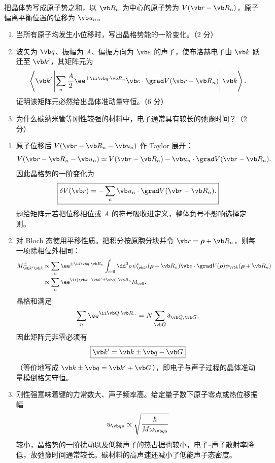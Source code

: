 \begin{question}[10 分]
把晶体势写成原子势之和，以 $\vb R_n$ 为中心的原子势为 $V(\vb r-\vb R_n)$，原子偏离平衡位置的位移为 $\vb u_n$。
\begin{enumerate}
  \item 当所有原子均发生小位移时，写出晶格势能的一阶变化。（2 分）
  \item 波矢为 $\vb q$、振幅为 $A$、偏振方向为 $\vb e$ 的声子，使布洛赫电子由 $\vb k$ 跃迁至 $\vb k'$，其矩阵元为
  \[
  \left\langle\vb k'\left|
  \sum_n\frac A2\ee^{\pm\ii\vb q\cdot\vb R_n}
  \vb e\cdot\grad V(\vb r-\vb R_n)
  \right|\vb k\right\rangle.
  \]
  证明该矩阵元必然给出晶体准动量守恒。（6 分）
  \item 为什么碳纳米管等刚性较强的材料中，电子通常具有较长的弛豫时间？（2 分）
\end{enumerate}


\begin{solution}
\begin{enumerate}
  \item 原子位移后
  $V(\vb r-\vb R_n-\vb u_n)$ 作 Taylor 展开：
  \[
    V(\vb r-\vb R_n-\vb u_n)
    \simeq V(\vb r-\vb R_n)
    -\vb u_n\cdot\grad V(\vb r-\vb R_n).
  \]
  因此晶格势的一阶变化为
  \[
    \boxed{\delta V(\vb r)=-\sum_n\vb u_n\cdot
    \grad V(\vb r-\vb R_n).}
  \]
  题给矩阵元若把位移相位或 $A$ 的符号吸收进定义，整体负号不影响选择定则。
  \item 对 Bloch 态使用平移性质。把积分按原胞分块并令
  $\vb r=\boldsymbol\rho+\vb R_n$，则每一项除相位外相同：
  \[
  \begin{aligned}
  M_{\vb k'\vb k}^{\pm}
  &\propto\sum_n\ee^{\pm\ii\vb q\cdot\vb R_n}
  \int_{\rm cell}\dd^3\rho\,
  \psi_{\vb k'}^*(\boldsymbol\rho+\vb R_n)
  \vb e\cdot\grad V(\boldsymbol\rho)
  \psi_{\vb k}(\boldsymbol\rho+\vb R_n)\\
  &\propto\sum_n\ee^{\ii(\vb k-\vb k'\pm\vb q)\cdot\vb R_n}M_{\rm cell}.
  \end{aligned}
  \]
  晶格和满足
  \[
    \sum_n\ee^{\ii\vb Q\cdot\vb R_n}
    =N\sum_{\vb G}\delta_{\vb Q,\vb G}.
  \]
  因此矩阵元非零必须有
  \[
    \boxed{\vb k'=\vb k\pm\vb q-\vb G}
  \]
  （等价地写成 $\vb k\pm\vb q=\vb k'+\vb G$），即电子与声子过程的晶体准动量模倒格矢守恒。
  \item 刚性强意味着键的力常数大、声子频率高。给定量子数下原子零点或热位移振幅
  \[
    u_{\vb q s}\propto\sqrt{\frac{\hbar}{M\omega_{\vb q s}}}
  \]
  较小，晶格势的一阶扰动以及低频声子的热占据也较小，电子--声子散射率降低，故弛豫时间通常较长。碳材料的高声速还减小了低能声子态密度。
\end{enumerate}
\end{solution}
\end{question}
